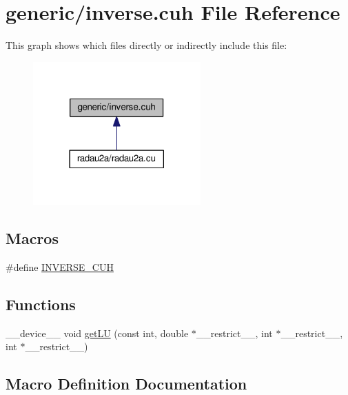 \hypertarget{inverse_8cuh}{}\section{generic/inverse.cuh File Reference}
\label{inverse_8cuh}
This graph shows which files directly or indirectly include this file\+:\nopagebreak
\begin{figure}[H]
\begin{center}
\leavevmode
\includegraphics[width=182pt]{inverse_8cuh__dep__incl}
\end{center}
\end{figure}
\subsection*{Macros}
\begin{DoxyCompactItemize}
\item 
\#define \hyperlink{inverse_8cuh_aff9b0f54fec8da78d669711592ceca2a}{I\+N\+V\+E\+R\+S\+E\+\_\+\+C\+UH}
\end{DoxyCompactItemize}
\subsection*{Functions}
\begin{DoxyCompactItemize}
\item 
\+\_\+\+\_\+device\+\_\+\+\_\+ void \hyperlink{inverse_8cuh_a138405fdf6512b1bf16282199a8f60cd}{get\+LU} (const int, double $\ast$\+\_\+\+\_\+restrict\+\_\+\+\_\+, int $\ast$\+\_\+\+\_\+restrict\+\_\+\+\_\+, int $\ast$\+\_\+\+\_\+restrict\+\_\+\+\_\+)
\end{DoxyCompactItemize}


\subsection{Macro Definition Documentation}
